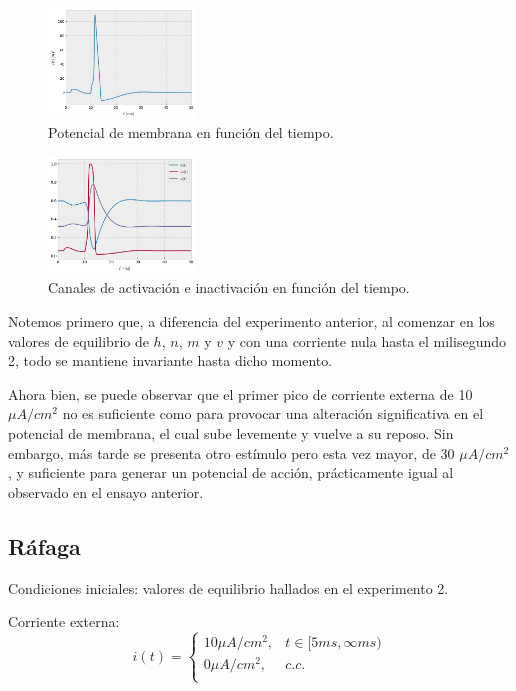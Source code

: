 \documentclass[aps,twocolumn,groupedaddress]{revtex4-2}
\begin{document}
\begin{figure}[ht]
    \centering
    \includegraphics[width=0.35\textwidth]{figs/ej4_potencial.png}
    \caption{Potencial de membrana en función del tiempo.} 
    \label{fig:ej4_potencial}
\end{figure}
\begin{figure}[ht]
    \centering
    \includegraphics[width=0.35\textwidth]{figs/ej4_canales.png}
    \caption{Canales de activación e inactivación en función del tiempo.} 
    \label{fig:ej4_canales}
\end{figure}

Notemos primero que, a diferencia del experimento anterior, al comenzar en los valores de equilibrio de $h$, $n$, $m$ y $v$ y con una corriente nula hasta el milisegundo 2, todo se mantiene invariante hasta dicho momento.

Ahora bien, se puede observar que el primer pico de corriente externa de 10 $\mu A/cm^2$ no es suficiente como para provocar una alteración significativa en el potencial de membrana, el cual sube levemente y vuelve a su reposo. Sin embargo, más tarde se presenta otro estímulo pero esta vez mayor, de 30 $\mu A/cm^2$, y suficiente para generar un potencial de acción, prácticamente igual al observado en el ensayo anterior.

\subsection{Ráfaga}
Condiciones iniciales: valores de equilibrio hallados en el experimento 2.

Corriente externa:
$$
i(t) = \left\{
\begin{array}{ll}
10 \mu A/cm^2, & t\in [5ms,\infty ms) \\
0 \mu A/cm^2, & c.c. \\
\end{array}
\right.
$$
\end{document}

